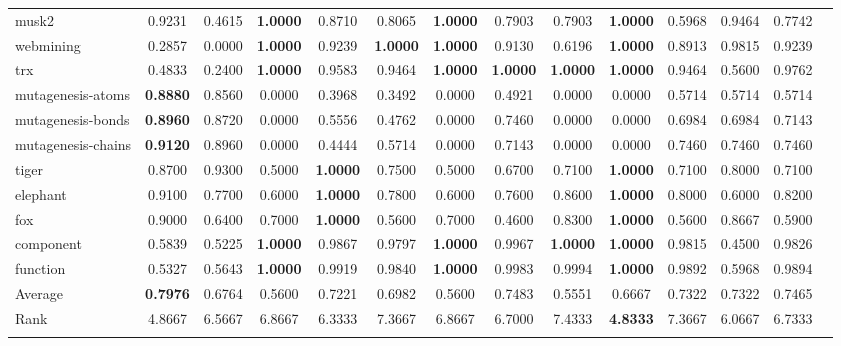 \documentclass[reqno]{vcuthesis}
\numberwithin{equation}{chapter}
\begin{document}
\begin{table}[H]
{\begin{tabular}{l@{\extracolsep{\fill}}ccccccccccccc}
musk2 &0.9231 &0.4615 &\textbf{1.0000} &0.8710 &0.8065 &\textbf{1.0000} &0.7903 &0.7903 &\textbf{1.0000} &0.5968 &0.9464 &0.7742 &  \\
webmining &0.2857 &0.0000 &\textbf{1.0000} &0.9239 &\textbf{1.0000} &\textbf{1.0000} &0.9130 &0.6196 &\textbf{1.0000} &0.8913 &0.9815 &0.9239 &  \\
trx &0.4833 &0.2400 &\textbf{1.0000} &0.9583 &0.9464 &\textbf{1.0000} &\textbf{1.0000} &\textbf{1.0000} &\textbf{1.0000} &0.9464 &0.5600 &0.9762 &  \\
mutagenesis-atoms &\textbf{0.8880} &0.8560 &0.0000 &0.3968 &0.3492 &0.0000 &0.4921 &0.0000 &0.0000 &0.5714 &0.5714 &0.5714 &  \\
mutagenesis-bonds &\textbf{0.8960} &0.8720 &0.0000 &0.5556 &0.4762 &0.0000 &0.7460 &0.0000 &0.0000 &0.6984 &0.6984 &0.7143 &  \\
mutagenesis-chains &\textbf{0.9120} &0.8960 &0.0000 &0.4444 &0.5714 &0.0000 &0.7143 &0.0000 &0.0000 &0.7460 &0.7460 &0.7460 &  \\
tiger &0.8700 &0.9300 &0.5000 &\textbf{1.0000} &0.7500 &0.5000 &0.6700 &0.7100 &\textbf{1.0000} &0.7100 &0.8000 &0.7100 &  \\
elephant &0.9100 &0.7700 &0.6000 &\textbf{1.0000} &0.7800 &0.6000 &0.7600 &0.8600 &\textbf{1.0000} &0.8000 &0.6000 &0.8200 &  \\
fox &0.9000 &0.6400 &0.7000 &\textbf{1.0000} &0.5600 &0.7000 &0.4600 &0.8300 &\textbf{1.0000} &0.5600 &0.8667 &0.5900 &  \\
component &0.5839 &0.5225 &\textbf{1.0000} &0.9867 &0.9797 &\textbf{1.0000} &0.9967 &\textbf{1.0000} &\textbf{1.0000} &0.9815 &0.4500 &0.9826 &  \\
function &0.5327 &0.5643 &\textbf{1.0000} &0.9919 &0.9840 &\textbf{1.0000} &0.9983 &0.9994 &\textbf{1.0000} &0.9892 &0.5968 &0.9894 &  \\
\noalign{\smallskip}\hline\noalign{\smallskip}
Average &\textbf{0.7976} &0.6764 &0.5600 &0.7221 &0.6982 &0.5600 &0.7483 &0.5551 &0.6667 &0.7322 &0.7322 &0.7465 &  \\
Rank &4.8667 &6.5667 &6.8667 &6.3333 &7.3667 &6.8667 &6.7000 &7.4333 &\textbf{4.8333} &7.3667 &6.0667 &6.7333 &  \\
\noalign{\smallskip}\hline
\end{tabular}}
\end{table}
\end{document}
